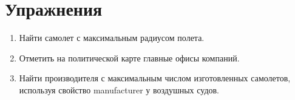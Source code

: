 




\section{Упражнения}
\begin{enumerate}
\item Найти самолет с максимальным радиусом полета.
\item Отметить на политической карте главные офисы компаний.
\item Найти производителя с максимальным числом изготовленных самолетов, используя свойство manufacturer у воздушных судов.
\end{enumerate}
